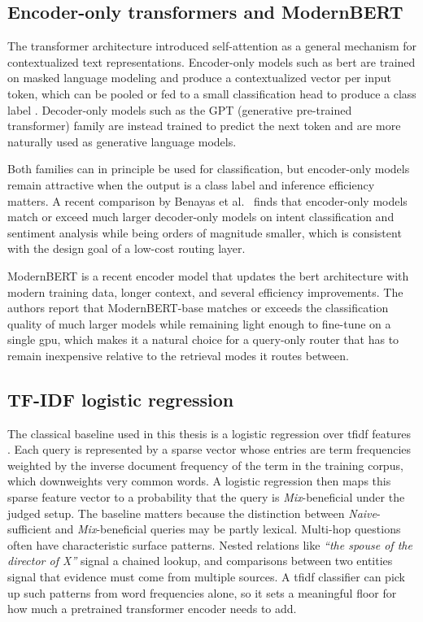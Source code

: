 \documentclass[english, bibtex]{kththesis}               %
\numberwithin{listing}{chapter}
\providecommand{\DIFaddtex}[1]{{\protect\color{blue} \sf #1}} %
\providecommand{\DIFaddbegin}{} %
\providecommand{\DIFaddend}{} %
\providecommand{\DIFadd}[1]{\texorpdfstring{\DIFaddtex{#1}}{#1}} %
\begin{document}
\subsection{Encoder-only transformers and ModernBERT}
\label{sec:backgroundEncoders}

The transformer architecture \cite{vaswani2017attention} introduced self-attention as a general mechanism for contextualized text representations. Encoder-only models such as \gls{bert} are trained on masked language modeling and produce a contextualized vector per input token, which can be pooled or fed to a small classification head to produce a class label \cite{devlin2019bert}. Decoder-only models such as the GPT \DIFaddbegin \DIFadd{(generative pre-trained transformer) }\DIFaddend family are instead trained to predict the next token and are more naturally used as generative language models.

Both families can in principle be used for classification, but encoder-only models remain attractive when the output is a class label and inference efficiency matters. A recent comparison by Benayas et al.\ \cite{benayas2024encoder} finds that encoder-only models match or exceed much larger decoder-only models on intent classification and sentiment analysis while being orders of magnitude smaller, which is consistent with the design goal of a low-cost routing layer.

ModernBERT \cite{warner2024modernbert} is a recent encoder model that updates the \gls{bert} architecture with modern training data, longer context, and several efficiency improvements. The authors report that ModernBERT-base matches or exceeds the classification quality of much larger models while remaining light enough to fine-tune on a single \gls{gpu}, which makes it a natural choice for a query-only router that has to remain inexpensive relative to the retrieval modes it routes between.

\subsection{TF-IDF logistic regression}
\label{sec:backgroundTfidf}

The classical baseline used in this thesis is a logistic regression over \gls{tfidf} features \cite{salton1988termweighting}. Each query is represented by a sparse vector whose entries are term frequencies weighted by the inverse document frequency of the term in the training corpus, which downweights very common words. A logistic regression then maps this sparse feature vector to a probability that the query is \emph{Mix}-beneficial under the judged setup. The baseline matters because the distinction between \emph{Naive}-sufficient and \emph{Mix}-beneficial queries may be partly lexical. Multi-hop questions often have characteristic surface patterns. Nested relations like \emph{``the spouse of the director of X''} signal a chained lookup, and comparisons between two entities signal that evidence must come from multiple sources. A \gls{tfidf} classifier can pick up such patterns from word frequencies alone, so it sets a meaningful floor for how much a pretrained transformer encoder needs to add.
\end{document}
